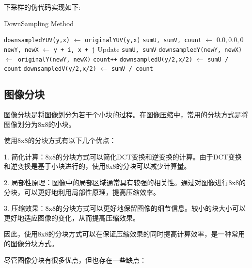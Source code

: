 \documentclass{article}
\begin{document}
下采样的伪代码实现如下:

\nopagebreak
\begin{algorithm}[H]
\caption{DownSampling Method}
\begin{algorithmic}[1]
     
            \State \texttt{downsampledYUV(y,x)} $\gets$ \texttt{originalYUV(y,x)}
        \EndFor
     
            \State \texttt{sumU, sumV, count} $\gets$ $0.0, 0.0, 0$
                \State \texttt{newY, newX} $\gets$ \texttt{y + i, x + j}
                    \State Update \texttt{sumU, sumV}
                    \State \texttt{downsampledY(newY, newX) $\gets$ \texttt{originalY(newY, newX)}}
                    \State \texttt{count++}
                \EndIf
            \EndFor
                \State \texttt{downsampledU(y/2,x/2)} $\gets$ \texttt{sumU / count}
                \State \texttt{downsampledV(y/2,x/2)} $\gets$ \texttt{sumV / count}
            \EndIf
        \EndFor
    \EndIf
\EndProcedure
\end{algorithmic}
\end{algorithm}


\subsection{图像分块}

图像分块是将图像划分为若干个小块的过程。在图像压缩中，常用的分块方式是将图像划分为8x8的小块。

使用8x8的分块方式有以下几个优点：

1. 简化计算：8x8的分块方式可以简化DCT变换和逆变换的计算。由于DCT变换和逆变换是基于小块进行的，使用8x8的分块可以减少计算量。

2. 局部性原理：图像中的局部区域通常具有较强的相关性。通过对图像进行8x8的分块，可以更好地利用局部性原理，提高压缩效率。

3. 压缩效果：8x8的分块方式可以更好地保留图像的细节信息。较小的块大小可以更好地适应图像的变化，从而提高压缩效果。

因此，使用8x8的分块方式可以在保证压缩效果的同时提高计算效率，是一种常用的图像分块方式。

尽管图像分块有很多优点，但也存在一些缺点：
\end{document}

